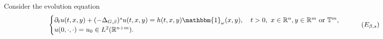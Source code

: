 \documentclass{article}
\numberwithin{equation}{section}
\newcommand\R{\ensuremath{\mathbb{R}}}
\newcommand\T{\ensuremath{\mathbb{T}}}
\newtheorem{corollary}[theorem]{Corollary}
\numberwithin{equation}{section}
\theoremstyle{definition}
\begin{document}
Consider the evolution equation
\begin{equation}\label{std.1}
	\begin{cases}
		\partial_t u(t,x,y)+(-\Delta_{G,\beta})^{s}u(t,x,y)=h(t,x,y)\mathbbm{1}_\omega(x,y),\quad  t>0,\,\, x \in \R^{n}, y \in \R^{m}\text{ or }\T^{m},\\
		u(0,\cdot ,\cdot )=u_0 \in L^2(\R^{n+m}).
	\end{cases}\tag{$E_{\beta,s}$}
\end{equation} 
\end{document}
